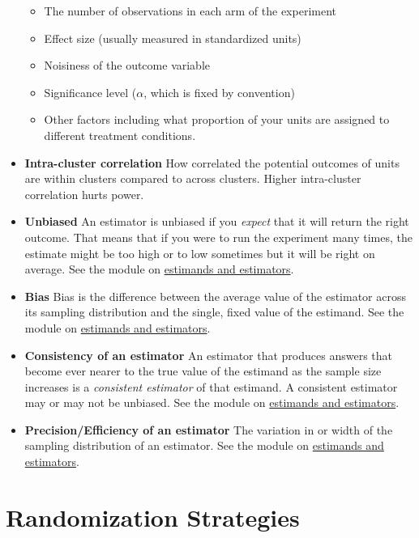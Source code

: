 \documentclass[12pt,]{book}
\providecommand{\tightlist}{%
  \setlength{\itemsep}{0pt}\setlength{\parskip}{0pt}}
\begin{document}
\begin{itemize}
  \begin{itemize}
  \tightlist
  \item
    The number of observations in each arm of the experiment
  \item
    Effect size (usually measured in standardized units)
  \item
    Noisiness of the outcome variable
  \item
    Significance level (\(\alpha\), which is fixed by convention)
  \item
    Other factors including what proportion of your units are assigned to
    different treatment conditions.
  \end{itemize}
\item
  \textbf{Intra-cluster correlation} How correlated the potential outcomes of units
  are within clusters compared to across clusters. Higher intra-cluster
  correlation hurts power.
\item
  \textbf{Unbiased} An estimator is unbiased if you \emph{expect} that it will return the
  right outcome. That means that if you were to run the experiment many times,
  the estimate might be too high or to low sometimes but it will be right on
  average. See the module on \href{estimands-and-estimators.html}{estimands and estimators}.
\item
  \textbf{Bias} Bias is the difference between the average value of the estimator
  across its sampling distribution and the single, fixed value of the estimand. See the module on \href{estimands-and-estimators.html}{estimands and estimators}.
\item
  \textbf{Consistency of an estimator} An estimator that produces answers that
  become ever nearer to the true value of the estimand as the sample size increases is a \emph{consistent estimator} of that estimand. A consistent estimator may or may not be unbiased. See the module on \href{estimands-and-estimators.html}{estimands and estimators}.
\item
  \textbf{Precision/Efficiency of an estimator} The variation in or width of the
  sampling distribution of an estimator. See the module on \href{estimands-and-estimators.html}{estimands and estimators}.
\end{itemize}

\hypertarget{randomization-strategies}{%
\section{Randomization Strategies}\label{randomization-strategies}}
\end{document}
